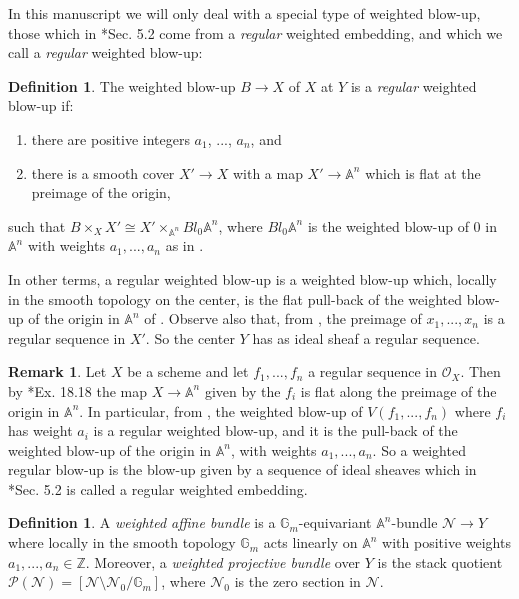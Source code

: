 \documentclass{amsart}
\newcommand{\bA}{\mathbb{A}}
\newcommand{\bG}{\mathbb{G}}
\newcommand{\cN}{\mathcal{N}}
\newcommand{\cO}{\mathcal{O}}
\newcommand{\cP}{\mathcal{P}}
\theoremstyle{definition}
\newtheorem{Def}[theorem]{Definition}
\newtheorem{Remark}[theorem]{Remark}
\begin{document}
In this manuscript we will only deal with a special type of weighted blow-up, those which in \cite{QR}*{Sec. 5.2} come from a \textit{regular} weighted embedding, and which we call a \textit{regular} weighted blow-up:
\begin{Def}
    The weighted blow-up $B\to X$ of $X$ at $Y$ is a \textit{regular} weighted blow-up if:
    \begin{enumerate}
        \item there are positive integers $a_1$, ..., $a_n$, and
        \item there is a smooth cover $X'\to X$ with a map $X'\to \bA^n$ which is flat at the preimage of the origin, 
    \end{enumerate}
    such that $B\times_X X'\cong X'\times_{\bA^n}Bl_0\bA^n$, where $Bl_0\bA^n$ is the weighted blow-up of 0 in $\bA^n$ with weights $a_1,...,a_n$ as in .
\end{Def}
In other terms, a {regular} weighted blow-up is a weighted blow-up which, locally in the smooth topology on the center, is the flat pull-back of the weighted blow-up of the origin in $\bA^n$ of .
Observe also that, from \cite[\href{https://stacks.math.columbia.edu/tag/062H}{Tag 062H}]{stacks-project}, the preimage of $x_1,...,x_n$ is a regular sequence in $X'$. So the center $Y$ has as ideal sheaf a regular sequence.
\begin{Remark}
    Let $X$ be a scheme and let $f_1,...,f_n$ a regular sequence in $\cO_X$. Then by \cite{Eisenbud}*{Ex. 18.18} the map $X\to \bA^n$ given by the $f_i$ is flat along the preimage of the origin in $\bA^n$.
    In particular, from , the weighted blow-up of $V(f_1,...,f_n)$ where $f_i$ has weight $a_i$ is a {regular weighted} blow-up, and it is the pull-back of the
    weighted blow-up of the origin in $\bA^n$, with weights $a_1,...,a_n$. So a weighted regular blow-up is the blow-up given by a sequence of ideal sheaves which in \cite{QR}*{Sec. 5.2} is called a regular weighted embedding.
\end{Remark}
\begin{Def}
    A \textit{weighted affine bundle} is a $\bG_m$-equivariant $\bA^n$-bundle $\cN \to Y$ where locally in the smooth topology $\bG_m$ acts linearly on $\mathbb{A}^n$ with positive weights $a_1,...,a_n \in \mathbb{Z}$. Moreover, a \textit{weighted projective bundle} over $Y$ is the stack quotient $\cP(\cN)=[\cN \setminus \cN_0/\bG_m]$, where $\cN_0$ is the zero section in $\cN$.
\end{Def}
\end{document}
